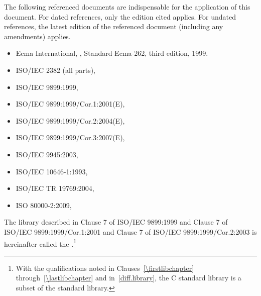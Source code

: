 \pnum
{}%
The following referenced documents are indispensable for the application
of this document. For dated references, only the edition cited applies.
For undated references, the latest edition of the referenced document
(including any amendments) applies.

\begin{itemize}
\item Ecma International, ,
Standard Ecma-262, third edition, 1999.
\item ISO/IEC 2382 (all parts), 
\item ISO/IEC 9899:1999, 
\item ISO/IEC 9899:1999/Cor.1:2001(E), 
\item ISO/IEC 9899:1999/Cor.2:2004(E), 
\item ISO/IEC 9899:1999/Cor.3:2007(E), 
\item ISO/IEC 9945:2003, 
\item ISO/IEC 10646-1:1993, 
\item ISO/IEC TR 19769:2004, 
\item ISO 80000-2:2009, 
\end{itemize}

\pnum
The library described in Clause 7 of ISO/IEC 9899:1999 and Clause 7 of
ISO/IEC 9899:1999/Cor.1:2001 and Clause 7 of ISO/IEC
9899:1999/Cor.2:2003 is hereinafter called the
.\footnote{With the qualifications noted in Clauses~\ref{\firstlibchapter}
through~\ref{\lastlibchapter} and in~\ref{diff.library}, the C standard
library is a subset of the \Cpp standard library.}

